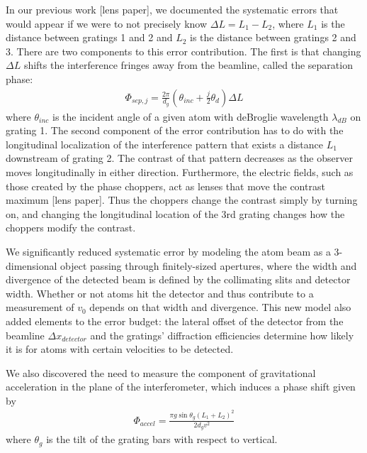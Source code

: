 \documentclass[twocolumn, prl,showpacs,superscriptaddress]{revtex4-1}   %
\begin{document}
In our previous work [lens paper], we documented the systematic errors that would appear if we were to not precisely know $\Delta L = L_1 - L_2$, where $L_1$ is the distance between gratings 1 and 2 and $L_2$ is the distance between gratings 2 and 3. There are two components to this error contribution. The first is that changing $\Delta L$ shifts the interference fringes away from the beamline, called the separation phase:
\begin{align}
	\Phi_{sep,j} = \frac{2\pi}{d_g}
	\left(
		\theta_{inc} + \frac{j}{2}\theta_d
	\right) \Delta L
	\label{phiSep}
\end{align}
where $\theta_{inc}$ is the incident angle of a given atom with deBroglie wavelength $\lambda_{dB}$ on grating 1. The second component of the error contribution has to do with the longitudinal localization of the interference pattern that exists a distance $L_1$ downstream of grating 2. The contrast of that pattern decreases as the observer moves longitudinally in either direction. Furthermore, the electric fields, such as those created by the phase choppers, 
act as lenses that move the contrast maximum [lens paper]. Thus the choppers change the contrast simply by turning on, and changing the longitudinal location of the 3rd grating changes how the choppers modify the contrast. 

We significantly reduced systematic error by modeling the atom beam as a 3-dimensional object passing through finitely-sized apertures, where the width and divergence of the detected beam is defined by the collimating slits and detector width. Whether or not atoms hit the detector and thus contribute to a measurement of $v_0$ depends on that width and divergence. This new model also added elements to the error budget: the lateral offset of the detector from the beamline $\Delta x_{detector}$ and the gratings' diffraction efficiencies determine how likely it is for atoms with certain velocities to be detected.

We also discovered the need to measure the component of gravitational acceleration in the plane of the interferometer, which induces a phase shift given by
\begin{align}
	\Phi_{accel} = \frac{\pi g\sin{\theta_g}(L_1+L_2)^2}{2d_g v^2}
	\label{phiAccel}
\end{align}
where $\theta_g$ is the tilt of the grating bars with respect to vertical.
\end{document}

